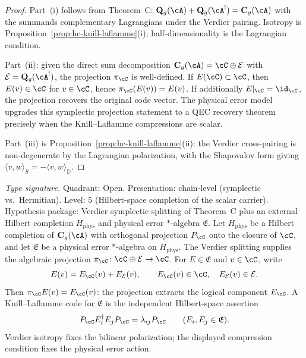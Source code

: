 \begin{proof}
Part~(i) follows from Theorem~C:
$\mathbf{Q}_g(\cA) + \mathbf{Q}_g(\cA^!) = \mathbf{C}_g(\cA)$
with the summands complementary Lagrangians under the Verdier
pairing. Isotropy is
Proposition~\ref{prop:hc-knill-laflamme}(i);
half-dimensionality is the Lagrangian condition.

Part~(ii): given the direct sum decomposition
$\mathbf{C}_g(\cA) = \cC \oplus \mathcal E$ with
$\mathcal E = \mathbf{Q}_g(\cA^!)$, the projection
$\pi_\cC$ is well-defined. If $E(\cC) \subset \cC$,
then $E(v)\in\cC$ for $v\in\cC$, hence
$\pi_\cC(E(v))=E(v)$.  If additionally $E|_\cC=\id_\cC$,
the projection recovers the original code vector.  The physical error
model upgrades this symplectic projection statement to a QEC recovery
theorem precisely when the Knill--Laflamme compressions are scalar.

Part~(iii) is Proposition~\ref{prop:hc-knill-laflamme}(ii):
the Verdier cross-pairing is non-degenerate by the
Lagrangian polarization, with the Shapovalov form
giving $\langle v, w \rangle_S = -\langle v, w
\rangle_{\mathbb{D}}$.
\end{proof}

\begin{proposition}
\label{prop:hc-projection-not-kl}
\textit{Type signature.} Quadrant: Open. Presentation: chain-level
(symplectic vs.\ Hermitian). Level: $5$ (Hilbert-space completion of
the scalar carrier). Hypothesis package: Verdier symplectic splitting
of Theorem~C plus an external Hilbert completion
$H_{\mathrm{phys}}$ and physical error $*$-algebra $\mathfrak E$.
\smallskip\noindent
Let $H_{\mathrm{phys}}$ be a Hilbert completion of
$\mathbf C_g(\cA)$ with orthogonal projection $P_\cC$ onto the
closure of $\cC$, and let $\mathfrak E$ be a physical error
$*$-algebra on $H_{\mathrm{phys}}$.  The Verdier splitting supplies
the algebraic projection
$\pi_\cC\colon \cC\oplus\mathcal E\to\cC$.  For
$E\in\mathfrak E$ and $v\in\cC$, write
\[
E(v)=E_{\cC}(v)+E_{\mathcal E}(v),
\qquad
E_{\cC}(v)\in\cC,\quad E_{\mathcal E}(v)\in\mathcal E.
\]
Then $\pi_\cC E(v)=E_{\cC}(v)$: the projection extracts the logical
component $E_{\cC}$.  A Knill--Laflamme code for $\mathfrak E$ is the
independent Hilbert-space assertion
\[
P_\cC E_i^\dagger E_j P_\cC=\lambda_{ij}P_\cC
\qquad(E_i,E_j\in\mathfrak E).
\]
Verdier isotropy fixes the bilinear polarization; the displayed
compression condition fixes the physical error action.
\end{proposition}


